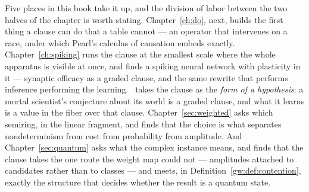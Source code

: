Five places in this book take it up, and the division of labor between the two halves of
the chapter is worth stating. Chapter~\ref{ch:do}, next, builds the first thing a clause can do
that a table cannot --- an operator that intervenes on a race, under which Pearl's calculus of
causation embeds exactly. Chapter~\ref{ch:spiking} runs the clause at the smallest
scale where the whole apparatus is visible at once, and finds a spiking neural network
with plasticity in it --- synaptic efficacy as a graded clause, and the same rewrite that
performs inference performing the learning. \chSci\ takes the clause as the \emph{form of
a hypothesis}: a mortal scientist's conjecture about its world is a graded clause, and
what it learns is a value in the fiber over that clause. Chapter~\ref{sec:weighted} asks
which semiring, in the linear fragment, and finds that the choice is what separates
nondeterminism from cost from probability from amplitude. And Chapter~\ref{sec:quantum}
asks what the complex instance means, and finds that the clause takes the one route the
weight map could not --- amplitudes attached to candidates rather than to classes ---
and meets, in Definition~\ref{gw:def:contention}, exactly the structure that decides
whether the result is a quantum state.

